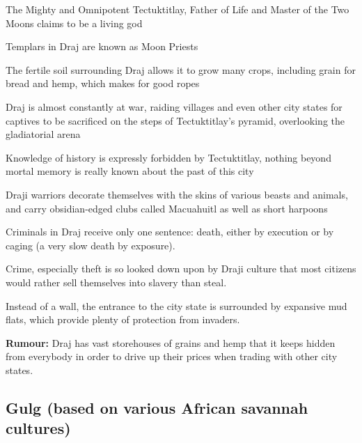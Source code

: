 \begin{multicols}{2}
\begin{description}
    \item The Mighty and Omnipotent Tectuktitlay, Father of Life and Master of the Two Moons claims to be a living god
    \item Templars in Draj are known as Moon Priests
    \item The fertile soil surrounding Draj allows it to grow many crops, including grain for bread and hemp, which makes for good ropes
    \item Draj is almost constantly at war, raiding villages and even other city states for captives to be sacrificed on the steps of Tectuktitlay’s pyramid, overlooking the gladiatorial arena
    \item Knowledge of history is expressly forbidden by Tectuktitlay, nothing beyond mortal memory is really known about the past of this city
    \item Draji warriors decorate themselves with the skins of various beasts and animals, and carry obsidian-edged clubs called Macuahuitl as well as short harpoons
    \item Criminals in Draj receive only one sentence: death, either by execution or by caging (a very slow death by exposure).
    \item Crime, especially theft is so looked down upon by Draji culture that most citizens would rather sell themselves into slavery than steal.
    \item Instead of a wall, the entrance to the city state is surrounded by expansive mud flats, which provide plenty of protection from invaders.
    \item \textbf{Rumour:} Draj has vast storehouses of grains and hemp that it keeps hidden from everybody in order to drive up their prices when trading with other city states.
\end{description}

\subsection{Gulg (based on various African savannah cultures)}


\end{multicols}
